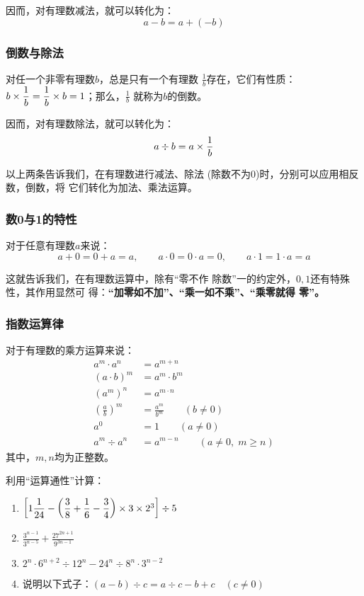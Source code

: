 因而，对有理数减法，就可以转化为：
\[a-b=a+(-b)\]

\subsubsection{倒数与除法}
\begin{blk}{}
	对任一个非零有理数$b$，总是只有一个有理数
	$\frac{1}{b}$存在，它们有性质：$b\times\dfrac{1}{b}= \dfrac{1}{b} \times b=1$；那么，$\frac{1}{b}$
	就称为$b$的倒数。
\end{blk}

因而，对有理数除法，就可以转化为：
\[a\div b=a\times\dfrac{1}{b}\]

以上两条告诉我们，在有理数进行减法、除法
(除数不为0)时，分别可以应用相反数，倒数，将
它们转化为加法、乘法运算。

\subsubsection{数0与1的特性}
\begin{blk}{}
	对于任意有理数$a$来说：
	\[a+0=0+a=a,\qquad  a\cdot 0=0\cdot a=0,\qquad a\cdot 1=1\cdot a=a\]
\end{blk}

这就告诉我们，在有理数运算中，除有“零不作
除数”一的约定外，$0,  1$还有特殊性，其作用显然可
得：\textbf{“加零如不加”、“乘一如不乘”、“乘零就得
	零”。}

\subsubsection{指数运算律}
\begin{blk}{}
	对于有理数的乘方运算来说：
	\[\begin{split}
	a^m\cdot a^n&=a^{m+n}\\
	(a\cdot b)^m&=a^{m}\cdot b^m\\
	(a^m)^n&=a^{m\cdot n}\\
	\left(\frac{a}{b}\right)^m&=\frac{a^m}{b^m}\qquad (b\ne 0)\\
	a^0&=1\qquad (a\ne 0)\\
	a^m\div a^n&=a^{m-n} \qquad (a\ne 0,\; m\ge n)
	\end{split}\]
	其中，$m, n$均为正整数。
\end{blk}

\begin{ex}
	利用“运算通性”计算：
	\begin{enumerate}
		\item $\left[1\dfrac{1}{24}-\left(\dfrac{3}{8}+\dfrac{1}{6}-\dfrac{3}{4}\right)\times3\times2^3\right]\div 5$
		\item $\frac{3^{n-1}}{3^{n-5}}+\frac{27^{2n+1}}{9^{3n-1}}$
		\item $2^n\cdot 6^{n+2}\div 12^n-24^n\div 8^n\cdot 3^{n-2}$
		\item 说明以下式子：$(a-b)\div c=a\div c-b+c\quad (c\ne 0)$
	\end{enumerate}
	
\end{ex}


